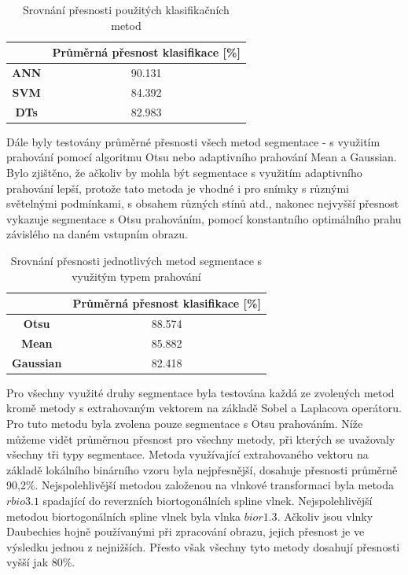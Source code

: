 \capstartfalse
\begin{table}[!htbp]
\centering
\begin{tabular}{|c|c|}
\hline
                             & \textbf{Průměrná přesnost klasifikace {[}\%{]}} \\ \hline
\textbf{ANN} & 90.131                                         \\ \hline
\textbf{SVM}                 & 84.392                                         \\ \hline
\textbf{DTs}   & 82.983                                         \\ \hline
\end{tabular}
\caption{Srovnání přesnosti použitých klasifikačních metod}
\end{table}
\capstarttrue

Dále byly testovány průměrné přesnosti všech metod segmentace - s využitím prahování pomocí algoritmu Otsu nebo adaptivního prahování Mean a Gaussian. Bylo zjištěno, že ačkoliv by mohla být segmentace s využitím adaptivního prahování lepší, protože tato metoda je vhodné i pro snímky s různými světelnými podmínkami, s obsahem různých stínů atd., nakonec nejvyšší přesnost vykazuje segmentace s Otsu prahováním, pomocí konstantního optimálního prahu závislého na daném vstupním obrazu.

\capstartfalse
\begin{table}[!htbp]
\centering
\begin{tabular}{|c|c|}
\hline
                  & \textbf{Průměrná přesnost klasifikace {[}\%{]}} \\ \hline
\textbf{Otsu}     & 88.574                                         \\ \hline
\textbf{Mean}     & 85.882                                         \\ \hline
\textbf{Gaussian} & 82.418                                         \\ \hline
\end{tabular}
\caption{Srovnání přesnosti jednotlivých metod segmentace s využitým typem prahování}
\end{table}
\capstarttrue

 Pro všechny využité druhy segmentace byla testována každá ze zvolených metod kromě metody s extrahovaným vektorem na základě Sobel a Laplacova operátoru. Pro tuto metodu byla zvolena pouze segmentace s Otsu prahováním. Níže můžeme vidět průměrnou přesnost pro všechny metody, při kterých se uvažovaly všechny tři typy segmentace. Metoda využívající extrahovaného vektoru na základě lokálního binárního vzoru byla nejpřesnější, dosahuje přesnosti průměrně 90,2\%. Nejspolehlivější metodou založenou na vlnkové transformaci byla metoda $rbio3.1$ spadající do reverzních biortogonálních spline vlnek. Nejspolehlivější metodou biortogonálních spline vlnek byla vlnka $bior1.3$. Ačkoliv jsou vlnky Daubechies hojně používanými při zpracování obrazu, jejich přesnost je ve výsledku jednou z nejnižších. Přesto však všechny tyto metody dosahují přesnosti vyšší jak 80\%.
 
